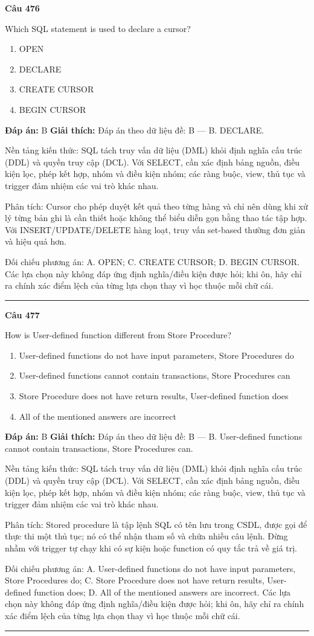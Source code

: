 \documentclass[11pt,a4paper]{article}
\newenvironment{question}[1]{%
  \par\vspace{1em}\noindent\textbf{\large Câu #1}\par\vspace{0.4em}
}{%
  \par\vspace{1em}\hrule\vspace{0.6em}
}
\newenvironment{choices}{%
  \begin{enumerate}[label=\textbf{\Alph*.},leftmargin=2.2em,itemsep=2pt,topsep=3pt]
}{%
  \end{enumerate}
}
\newcommand{\choice}{\item}
\begin{document}
\begin{question}{476}
Which SQL statement is used to declare a cursor?
\begin{choices}
\choice OPEN
\choice DECLARE
\choice CREATE CURSOR
\choice BEGIN CURSOR
\end{choices}
\textbf{Đáp án:} B
\textbf{Giải thích:} Đáp án theo dữ liệu đề: B — B. DECLARE.

Nền tảng kiến thức: SQL tách truy vấn dữ liệu (DML) khỏi định nghĩa cấu trúc (DDL) và quyền truy cập (DCL). Với SELECT, cần xác định bảng nguồn, điều kiện lọc, phép kết hợp, nhóm và điều kiện nhóm; các ràng buộc, view, thủ tục và trigger đảm nhiệm các vai trò khác nhau.

Phân tích: Cursor cho phép duyệt kết quả theo từng hàng và chỉ nên dùng khi xử lý từng bản ghi là cần thiết hoặc không thể biểu diễn gọn bằng thao tác tập hợp. Với INSERT/UPDATE/DELETE hàng loạt, truy vấn set-based thường đơn giản và hiệu quả hơn.

Đối chiếu phương án: A. OPEN; C. CREATE CURSOR; D. BEGIN CURSOR. Các lựa chọn này không đáp ứng định nghĩa/điều kiện được hỏi; khi ôn, hãy chỉ ra chính xác điểm lệch của từng lựa chọn thay vì học thuộc mỗi chữ cái.
\end{question}

\begin{question}{477}
How is User-defined function different from Store Procedure?
\begin{choices}
\choice User-defined functions do not have input parameters, Store Procedures do
\choice User-defined functions cannot contain transactions, Store Procedures can
\choice Store Procedure does not have return results, User-defined function does
\choice All of the mentioned answers are incorrect
\end{choices}
\textbf{Đáp án:} B
\textbf{Giải thích:} Đáp án theo dữ liệu đề: B — B. User-defined functions cannot contain transactions, Store Procedures can.

Nền tảng kiến thức: SQL tách truy vấn dữ liệu (DML) khỏi định nghĩa cấu trúc (DDL) và quyền truy cập (DCL). Với SELECT, cần xác định bảng nguồn, điều kiện lọc, phép kết hợp, nhóm và điều kiện nhóm; các ràng buộc, view, thủ tục và trigger đảm nhiệm các vai trò khác nhau.

Phân tích: Stored procedure là tập lệnh SQL có tên lưu trong CSDL, được gọi để thực thi một thủ tục; nó có thể nhận tham số và chứa nhiều câu lệnh. Đừng nhầm với trigger tự chạy khi có sự kiện hoặc function có quy tắc trả về giá trị.

Đối chiếu phương án: A. User-defined functions do not have input parameters, Store Procedures do; C. Store Procedure does not have return results, User-defined function does; D. All of the mentioned answers are incorrect. Các lựa chọn này không đáp ứng định nghĩa/điều kiện được hỏi; khi ôn, hãy chỉ ra chính xác điểm lệch của từng lựa chọn thay vì học thuộc mỗi chữ cái.
\end{question}
\end{document}
